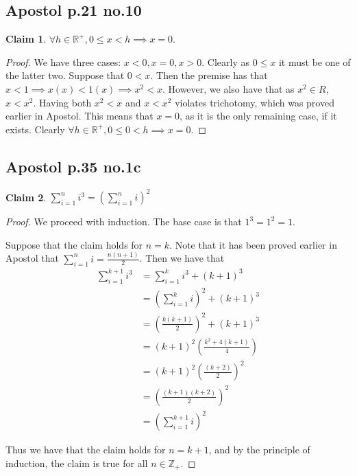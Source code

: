 \documentclass[12pt,letterpaper]{article}
\theoremstyle{definition}
\newtheorem*{claim}{Claim}
\newcommand{\R}{\mathbb{R}}
\newcommand{\Z}{\mathbb{Z}}
\begin{document}
\subsection*{Apostol p.21 no.10}

\begin{claim}
    $\forall h \in \R^+, 0 \leq x < h \implies x = 0$.
\end{claim}

\begin{proof}
    We have three cases: $x < 0, x = 0, x > 0$.
    Clearly as $0 \leq x$ it must be one of the latter two.
    Suppose that $0 < x$.
    Then the premise has that $x < 1 \implies x(x) < 1(x) \implies x^2 < x$.
    However, we also have that as $x^2 \in R$, $x < x^2$.
    Having both $x^2 < x$ and $x < x^2$ violates trichotomy, which was proved earlier
    in Apostol. This means that $x = 0$, as it is the only remaining case, if it exists.
    Clearly $\forall h \in \R^+, 0 \leq 0 < h \implies x = 0$.
\end{proof}

\subsection*{Apostol p.35 no.1c}

\begin{claim}
    $\sum_{i=1}^{n} i^3 = (\sum_{i=1}^{n} i)^2$
\end{claim}

\begin{proof}
    We proceed with induction. The base case is that $1^3 = 1^2 = 1$.

    Suppose that the claim holds for $n = k$.
    Note that it has been proved earlier in Apostol that 
    $\sum_{i=1}^{n} i = \frac{n(n+1)}{2}$.
    Then we have that 
    \begin{align*}
        \sum_{i=1}^{k+1} i^3 &= \sum_{i=1}^{k} i^3 + (k+1)^3 \\
        &= (\sum_{i=1}^{k} i)^2 + (k+1)^3 \\
        &= (\frac{k(k+1)}{2})^2 + (k+1)^3 \\
        &= (k+1)^2(\frac{k^2 + 4(k+1)}{4}) \\
        &= (k+1)^2(\frac{(k+2)}{2})^2 \\
        &= (\frac{(k+1)(k+2)}{2})^2 \\
        &= (\sum_{i=1}^{k+1} i)^2
    \end{align*}

    Thus we have that the claim holds for $n = k+1$, and by the principle of induction,
    the claim is true for all $n \in \Z_+$. 
\end{proof}
\end{document}
